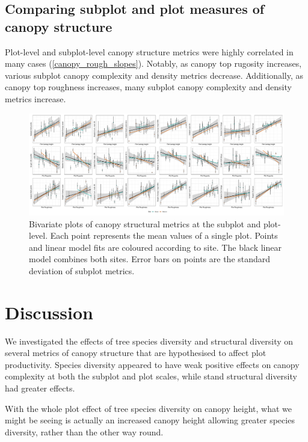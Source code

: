 \documentclass[11pt,a4paper]{article}
\begin{document}
\subsection{Comparing subplot and plot measures of canopy structure}

Plot-level and subplot-level canopy structure metrics were highly correlated in many cases (\autoref{canopy_rough_slopes}). Notably, as canopy top rugosity increases, various subplot canopy complexity and density metrics decrease. Additionally, as canopy top roughness increases, many subplot canopy complexity and density metrics increase.


\begin{figure}[H]
\centering
	\includegraphics[width=\textwidth]{plot_subplot_bivar}
	\caption{Bivariate plots of canopy structural metrics at the subplot and plot-level. Each point represents the mean values of a single plot. Points and linear model fits are coloured according to site. The black linear model combines both sites. Error bars on points are the standard deviation of subplot metrics.}
	\label{plot_subplot_bivar}
\end{figure}



\section{Discussion}

We investigated the effects of tree species diversity and structural diversity on several metrics of canopy structure that are hypothesised to affect plot productivity. Species diversity appeared to have weak positive effects on canopy complexity at both the subplot and plot scales, while stand structural diversity had greater effects.

With the whole plot effect of tree species diversity on canopy height, what we might be seeing is actually an increased canopy height allowing greater species diversity, rather than the other way round.
\end{document}
